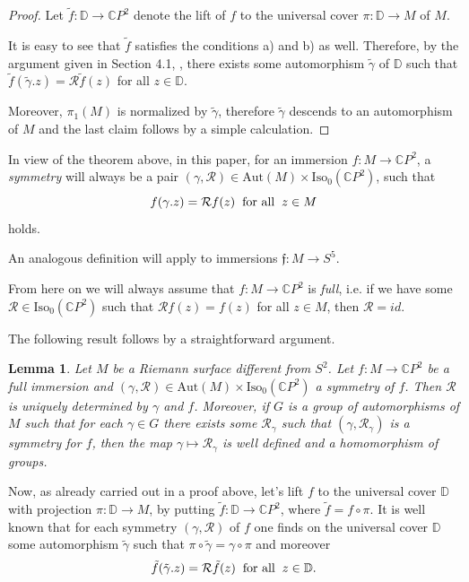 \documentclass[a4paper,11pt]{amsart}
\newtheorem{lemma}[theorem]{Lemma}
\theoremstyle{definition}
\numberwithin{equation}{section}
\newcommand{\C}{\mathbb{C}}
\newcommand{\D}{\mathbb{D}}
\newcommand{\f}{\mathfrak{f}}
\begin{document}
\begin{proof}
Let $\tilde{f} : \D \rightarrow \C P^2$ denote the lift of $f$ to the universal cover 
$\pi: \D \rightarrow M$ of $M$.

It is easy to see that $\tilde{f}$ satisfies the conditions a) and b) as well. Therefore, by the argument given in Section 4.1,
\cite{DoMaB1},
there exists some automorphism  $\tilde{\gamma}$ of $\D$
such that $\tilde{f}(\tilde{\gamma}.z)  = \mathcal{R} \tilde{f}(z)$ for all $z\in \D$.

Moreover, 
$\pi_1(M)$ is normalized by $\tilde{\gamma}$, 
therefore $\tilde{\gamma}$ 
descends to an automorphism of $M$ and the last claim follows by a simple calculation.
\end{proof} 
 
 In view of the theorem above,  in this paper, for an immersion $f: M\rightarrow \C P^2$,  a \emph{symmetry} will always be a pair $(\gamma, \mathcal{R}) \in
\mathrm{Aut}(M)\times \mathrm{Iso}_0(\C P^2)$, such that 
\begin{equation} \label{basic-symmetry}
f(\gamma . z) = \mathcal{R}  f(z) \hspace{2mm} \mbox{for all} \hspace{2mm} z \in M
\end{equation}
 holds.
 
 An analogous definition will apply to immersions $\f : M \rightarrow S^5$.

 From here on we will always assume 
 that $f: M \rightarrow \mathbb{C}P^2$ is  \emph{full},  i.e.  if we have some  $\mathcal{R} \in  \mathrm{Iso}_0(\C P^2)$ such that
$\mathcal{R}f(z) = f(z)$ for all $z \in M$, then $\mathcal{R}  = id$.


The following result follows by a straightforward argument.
\begin{lemma}
Let $M$ be a Riemann surface different from $S^2$. Let  $f: M\rightarrow \C P^2$ be a full immersion and
$(\gamma, \mathcal{R}) \in
\mathrm{Aut}(M)\times \mathrm{Iso}_0(\C P^2)$ a symmetry of $f$.
Then $\mathcal{R}$ is uniquely determined by $\gamma$ and $f$.
Moreover, if $G$ is a group of automorphisms of $M$ such that for each $\gamma \in G$ there exists some $\mathcal{R}_\gamma$ such that $(\gamma, \mathcal{R}_\gamma )$ is a symmetry for $f$, then the map $\gamma \mapsto \mathcal{R}_\gamma$  is well defined and a homomorphism of groups.
\end{lemma}


Now, as already carried out in a proof above, let's lift $f$ to the universal cover $\D$ with projection $\pi : \D \rightarrow M$, by putting  $\tilde{f}: \D \rightarrow \mathbb{C}P^2$,  where $\tilde{f} = f \circ \pi$.
It is well  known that for each symmetry $(\gamma, \mathcal{R})$ of $f$  one finds on the universal cover 
$\D$  some automorphism $\tilde{\gamma}$  such that 
$\pi \circ \tilde{\gamma} = \gamma \circ  \pi$ and moreover
\begin{equation}\label{eq:sym_tilde_f}
\tilde{f}(\tilde{\gamma}. z) = \mathcal{R} \tilde{f}(z) \hspace{2mm} \mbox{for all} \hspace{2mm} z \in \D.
\end{equation}
\end{document}

